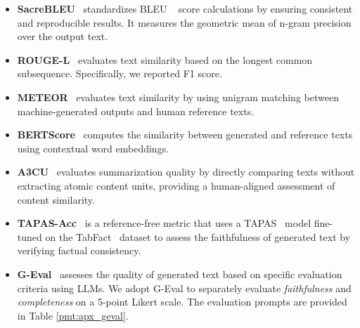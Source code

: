 \begin{itemize}[leftmargin=*,topsep=4pt,itemsep=4pt,parsep=0pt]

    \item\textbf{SacreBLEU}~\citep{Post2018ACF} standardizes BLEU ~\cite{Papineni2002BleuAM} score calculations by ensuring consistent and reproducible results.
    It measures the geometric mean of n-gram precision over the output text.
    
    \item\textbf{ROUGE-L}~\citep{Lin2003AutomaticEO} evaluates text similarity based on the longest common subsequence.
    Specifically, we reported F1 score.
    
    \item\textbf{METEOR}~\citep{Banerjee2005METEORAA} evaluates text similarity by using unigram matching between machine-generated outputs and human reference texts.
    
    \item\textbf{BERTScore}~\citep{Zhang2019BERTScoreET} computes the similarity between generated and reference texts using contextual word embeddings.
    
    \item\textbf{A3CU}~\citep{liu-etal-2023-towards-interpretable} evaluates summarization quality by directly comparing texts without extracting atomic content units, providing a human-aligned assessment of content similarity.
    
    \item\textbf{TAPAS-Acc}~\citep{Liu2022PLOGTP} is a reference-free metric that uses a TAPAS~\citep{Herzig2020TaPasWS} model fine-tuned on the TabFact~\cite{Chen2019TabFactAL} dataset to assess the faithfulness of generated text by verifying factual consistency.
    
    \item\textbf{G-Eval}~\citep{Liu2023GEvalNE} assesses the quality of generated text based on specific evaluation criteria using LLMs.
    We adopt G-Eval to separately evaluate \textit{faithfulness} and \textit{completeness} on a 5-point Likert scale.
    The evaluation prompts are provided in Table \ref{pmt:apx_geval}.

\end{itemize}

